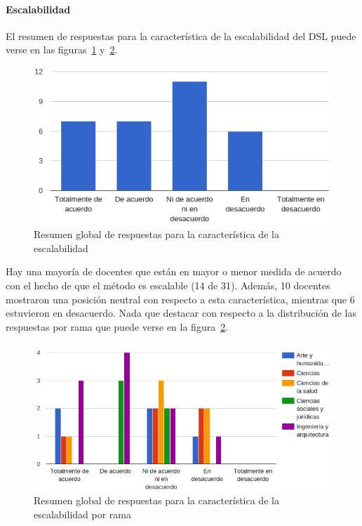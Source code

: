\newpage
\paragraph*{Escalabilidad}

El resumen de respuestas para la característica de la escalabilidad del DSL puede verse en las figuras~\ref{fig:evalmetodo:dsl:escalabilidad} y~\ref{fig:evalmetodo:dsl:escalabilidad:rama}.

\begin{figure}[h]
  \begin{center}
    \includegraphics[scale=0.5]{C_DSL_escalabilidad.png}
  \end{center}
  \caption{Resumen global de respuestas para la característica de la escalabilidad}
  \label{fig:evalmetodo:dsl:escalabilidad}
\end{figure}

Hay una mayoría de docentes que están en mayor o menor medida de acuerdo con el hecho de que el método es escalable (14 de 31). Además, 10 docentes mostraron una posición neutral con respecto a esta característica, mientras que 6 estuvieron en desacuerdo. Nada que destacar con respecto a la distribución de las respuestas por rama que puede verse en la figura~\ref{fig:evalmetodo:dsl:escalabilidad:rama}.

\begin{figure}[h]
  \begin{center}
    \includegraphics[scale=0.5]{C_DSL_escalabilidad_rama.png}
  \end{center}
  \caption{Resumen global de respuestas para la característica de la escalabilidad por rama}
  \label{fig:evalmetodo:dsl:escalabilidad:rama}
\end{figure}

